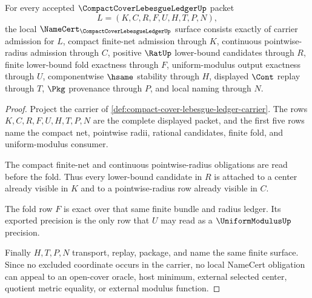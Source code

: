 \begin{theorem}
\label{thm:compact-cover-lebesgue-ledger-namecert-obligations}
For every accepted $\CompactCoverLebesgueLedgerUp$ packet
$$
L=(K,C,R,F,U,H,T,P,N),
$$
the local $\NameCert_{\CompactCoverLebesgueLedgerUp}$ surface consists exactly of carrier admission for $L$, compact finite-net admission through $K$, continuous pointwise-radius admission through $C$, positive $\RatUp$ lower-bound candidates through $R$, finite lower-bound fold exactness through $F$, uniform-modulus output exactness through $U$, componentwise $\hsame$ stability through $H$, displayed $\Cont$ replay through $T$, $\Pkg$ provenance through $P$, and local naming through $N$.
\end{theorem}
\begin{proof}
Project the carrier of \autoref{def:compact-cover-lebesgue-ledger-carrier}. The rows $K,C,R,F,U,H,T,P,N$ are the complete displayed packet, and the first five rows name the compact net, pointwise radii, rational candidates, finite fold, and uniform-modulus consumer.

The compact finite-net and continuous pointwise-radius obligations are read before the fold. Thus every lower-bound candidate in $R$ is attached to a center already visible in $K$ and to a pointwise-radius row already visible in $C$.

The fold row $F$ is exact over that same finite bundle and radius ledger. Its exported precision is the only row that $U$ may read as a $\UniformModulusUp$ precision.

Finally $H,T,P,N$ transport, replay, package, and name the same finite surface. Since no excluded coordinate occurs in the carrier, no local NameCert obligation can appeal to an open-cover oracle, host minimum, external selected center, quotient metric equality, or external modulus function.
\end{proof}

